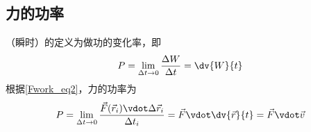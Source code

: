 \subsection{力的功率}
（瞬时）的定义为做功的变化率，即
\begin{equation}
P = \lim_{\Delta t\to 0} \frac{\Delta W}{\Delta t} = \dv{W}{t}
\end{equation}
根据\autoref{Fwork_eq2}，力的功率为
\begin{equation}
P = \lim_{\Delta t\to 0} \frac{\vec F(\vec r_i)\vdot\Delta\vec r_i}{\Delta t_i} = \vec F \vdot\dv{\vec r}{t} = \vec F\vdot\vec v
\end{equation}







